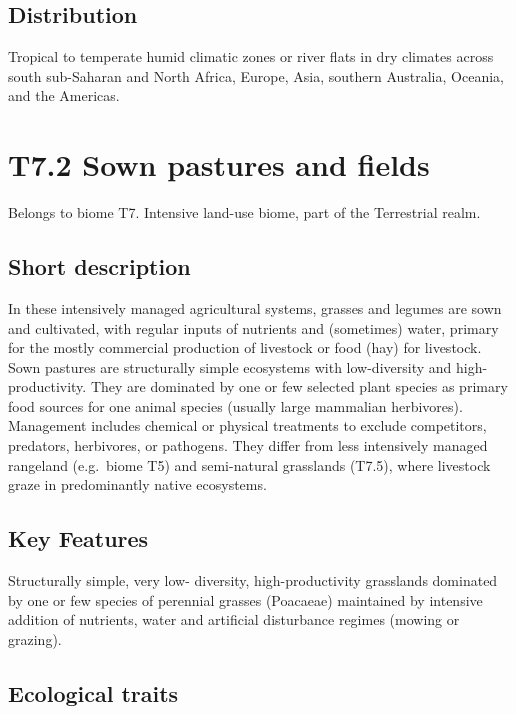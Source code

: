 \documentclass[
  letterpaper,
  DIV=11,
  numbers=noendperiod]{scrartcl}
\begin{document}
\subsection{Distribution}\label{distribution-98}

Tropical to temperate humid climatic zones or river flats in dry
climates across south sub-Saharan and North Africa, Europe, Asia,
southern Australia, Oceania, and the Americas.

\section{T7.2 Sown pastures and
fields}\label{t7.2-sown-pastures-and-fields}

Belongs to biome T7. Intensive land-use biome, part of the Terrestrial
realm.

\subsection{Short description}\label{short-description-99}

In these intensively managed agricultural systems, grasses and legumes
are sown and cultivated, with regular inputs of nutrients and
(sometimes) water, primary for the mostly commercial production of
livestock or food (hay) for livestock. Sown pastures are structurally
simple ecosystems with low-diversity and high-productivity. They are
dominated by one or few selected plant species as primary food sources
for one animal species (usually large mammalian herbivores). Management
includes chemical or physical treatments to exclude competitors,
predators, herbivores, or pathogens. They differ from less intensively
managed rangeland (e.g.~biome T5) and semi-natural grasslands (T7.5),
where livestock graze in predominantly native ecosystems.

\subsection{Key Features}\label{key-features-99}

Structurally simple, very low- diversity, high-productivity grasslands
dominated by one or few species of perennial grasses (Poacaeae)
maintained by intensive addition of nutrients, water and artificial
disturbance regimes (mowing or grazing).

\subsection{Ecological traits}\label{ecological-traits-99}
\end{document}
